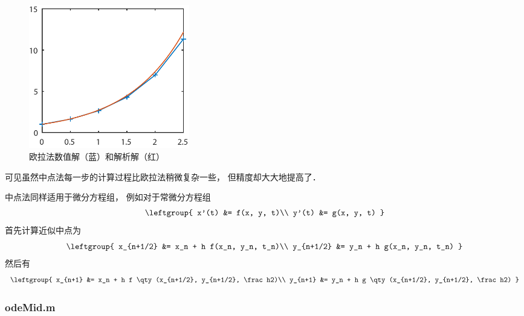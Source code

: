 \begin{figure}[ht]
\centering
\includegraphics[width=7cm]{./figures/OdeMid2.pdf}
\caption{欧拉法数值解（蓝）和解析解（红）} \label{OdeMid_fig2}
\end{figure}

可见虽然中点法每一步的计算过程比欧拉法稍微复杂一些， 但精度却大大地提高了． 

中点法同样适用于微分方程组， 例如对于常微分方程组
\begin{equation}\leftgroup{
x'(t) &= f(x, y, t)\\
y'(t) &= g(x, y, t)
}\end{equation}
首先计算近似中点为
\begin{equation}\leftgroup{
x_{n+1/2} &= x_n + h f(x_n, y_n, t_n)\\
y_{n+1/2} &= y_n + h g(x_n, y_n, t_n)
}\end{equation}
然后有
\begin{equation}\label{OdeMid_eq7}
\leftgroup{
x_{n+1} &= x_n + h f \qty(x_{n+1/2}, y_{n+1/2}, \frac h2)\\
y_{n+1} &= y_n + h g \qty(x_{n+1/2}, y_{n+1/2}, \frac h2)
}\end{equation}

\subsubsection{odeMid.m}




